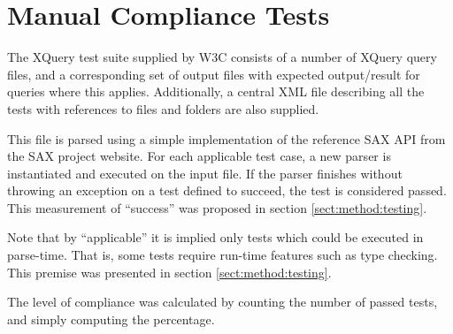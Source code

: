 \section{Manual Compliance Tests}
\label{sect:implementation:manualCoverage}
The XQuery test suite supplied by W3C\cite{w3c05} consists of a number of
XQuery query files, and a corresponding set of output files with expected
output/result for queries where this applies. Additionally, a central XML file
describing all the tests with references to files and folders are also supplied.

This file is parsed using a simple implementation of the reference SAX API
from the SAX project website\cite{saxproject}. For each applicable
test case, a new parser is instantiated and executed on the input file. If the
parser finishes without throwing an exception on a test defined to succeed, the test is considered passed.
This measurement of ``success'' was proposed in section \ref{sect:method:testing}.

Note that by ``applicable'' it is implied only tests which could be executed in
parse-time. That is, some tests require run-time features such as type
checking. This premise was presented in section \ref{sect:method:testing}.

The level of compliance was calculated by counting the number of passed tests, and
simply computing the percentage.